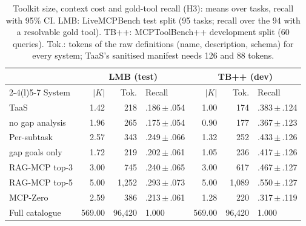 \begin{table}[t]
\caption{Toolkit size, context cost and gold-tool recall (H3): means over tasks, recall with 95\% CI. LMB:
LiveMCPBench test split (95 tasks; recall over the 94 with a resolvable gold tool). TB++: MCPToolBench++
development split (60 queries). Tok.: tokens of the raw definitions (name, description, schema) for every
system; TaaS's sanitised manifest needs 126 and 88 tokens.}
\label{tab:eval-h3}
\centering\footnotesize\setlength{\tabcolsep}{2.2pt}
\begin{tabular}{@{}lrrlrrl@{}}
\toprule
 & \multicolumn{3}{c}{LMB (test)} & \multicolumn{3}{c}{TB++ (dev)}\\
\cmidrule(lr){2-4}\cmidrule(l){5-7}
System & $|K|$ & Tok. & Recall & $|K|$ & Tok. & Recall\\
\midrule
TaaS & 1.42 & 218 & .186\,$\pm$\,.054 & 1.00 & 174 & .383\,$\pm$\,.124 \\
\quad no gap analysis & 1.96 & 265 & .175\,$\pm$\,.054 & 0.90 & 177 & .367\,$\pm$\,.123 \\
\addlinespace[2pt]
Per-subtask & 2.57 & 343 & .249\,$\pm$\,.066 & 1.32 & 252 & .433\,$\pm$\,.126 \\
\quad gap goals only & 1.72 & 219 & .202\,$\pm$\,.061 & 1.05 & 236 & .417\,$\pm$\,.126 \\
RAG-MCP top-3 & 3.00 & 745 & .240\,$\pm$\,.065 & 3.00 & 617 & .467\,$\pm$\,.127 \\
RAG-MCP top-5 & 5.00 & 1{,}252 & .293\,$\pm$\,.073 & 5.00 & 1{,}089 & .550\,$\pm$\,.127 \\
MCP-Zero & 2.59 & 386 & .213\,$\pm$\,.061 & 1.28 & 220 & .317\,$\pm$\,.119 \\
Full catalogue & 569.00 & 96{,}420 & 1.000 & 569.00 & 96{,}420 & 1.000 \\
\bottomrule
\end{tabular}
\end{table}

